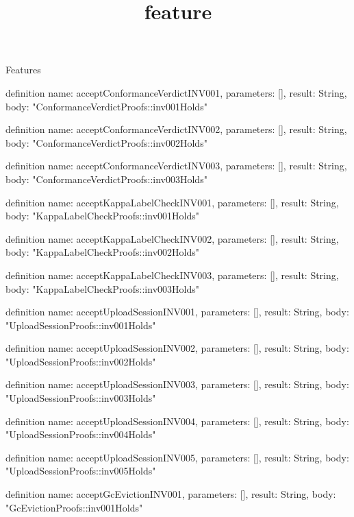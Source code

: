 \begin{lexlean}{Features}
\title{feature}
\begin{semanticmodule}
definition{
  name: acceptConformanceVerdictINV001,
  parameters: [],
  result: String,
  body: "ConformanceVerdictProofs::inv001Holds"
}

definition{
  name: acceptConformanceVerdictINV002,
  parameters: [],
  result: String,
  body: "ConformanceVerdictProofs::inv002Holds"
}

definition{
  name: acceptConformanceVerdictINV003,
  parameters: [],
  result: String,
  body: "ConformanceVerdictProofs::inv003Holds"
}

definition{
  name: acceptKappaLabelCheckINV001,
  parameters: [],
  result: String,
  body: "KappaLabelCheckProofs::inv001Holds"
}

definition{
  name: acceptKappaLabelCheckINV002,
  parameters: [],
  result: String,
  body: "KappaLabelCheckProofs::inv002Holds"
}

definition{
  name: acceptKappaLabelCheckINV003,
  parameters: [],
  result: String,
  body: "KappaLabelCheckProofs::inv003Holds"
}

definition{
  name: acceptUploadSessionINV001,
  parameters: [],
  result: String,
  body: "UploadSessionProofs::inv001Holds"
}

definition{
  name: acceptUploadSessionINV002,
  parameters: [],
  result: String,
  body: "UploadSessionProofs::inv002Holds"
}

definition{
  name: acceptUploadSessionINV003,
  parameters: [],
  result: String,
  body: "UploadSessionProofs::inv003Holds"
}

definition{
  name: acceptUploadSessionINV004,
  parameters: [],
  result: String,
  body: "UploadSessionProofs::inv004Holds"
}

definition{
  name: acceptUploadSessionINV005,
  parameters: [],
  result: String,
  body: "UploadSessionProofs::inv005Holds"
}

definition{
  name: acceptGcEvictionINV001,
  parameters: [],
  result: String,
  body: "GcEvictionProofs::inv001Holds"
}


\end{semanticmodule}
\end{lexlean}
